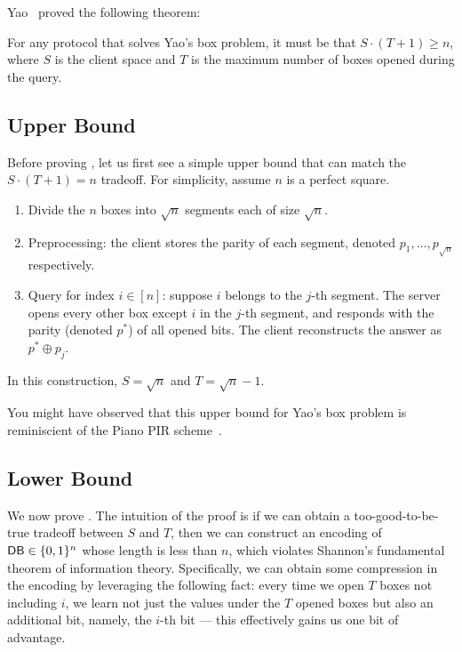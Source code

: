 Yao~\cite{yao} proved the following theorem:

\begin{theorem} 
For any protocol that solves Yao's box problem, it must be that 
$S \cdot (T+1) \geq n$, 
where $S$ is the client space
and $T$ is the maximum number of boxes opened during the query. 
\label{thm:yaobox}
\end{theorem} 


\subsection{Upper Bound}
Before proving , 
let us first see a simple upper bound that can match 
the $S\cdot (T+1) = n$ tradeoff.
For simplicity, assume $n$ is a perfect square.
\begin{enumerate}
    \item Divide the $n$ boxes into $\sqrt{n}$ segments each
of size $\sqrt{n}$. 
    \item Preprocessing: 
the client stores the parity of each segment, denoted $p_1, \ldots, p_{\sqrt{n}}$
respectively.
    \item Query for index $i \in [n]$: 
suppose $i$ belongs 
to the $j$-th segment. 
The server opens 
every other box 
except $i$ in the $j$-th segment,  %
and responds with the parity 
(denoted $p^*$)
of all opened bits.
The client reconstructs %
the answer 
as $p^* \oplus p_j$.
\end{enumerate}
In this construction, $S = \sqrt{n}$ and $T = \sqrt{n} - 1$.

You might have observed that this upper bound for Yao's
box problem is reminiscient of the  
Piano PIR scheme~\cite{piano}.


\subsection{Lower Bound} 
We now prove .
The intuition of the proof is 
if we can obtain a too-good-to-be-true  
tradeoff 
between $S$ and $T$, then we can construct 
an encoding of ${\sf DB} \in \{0, 1\}^n$ 
whose length is less than $n$, 
which violates 
Shannon's  
fundamental theorem of information theory.
Specifically, we can obtain some compression 
in the encoding 
by leveraging the following fact: every time 
we open $T$ boxes not including $i$, we 
learn not just the values under the $T$ opened boxes 
but also an additional 
bit, namely, the $i$-th bit --- this effectively  
gains us one bit of advantage.

